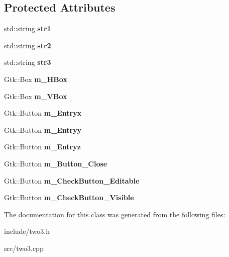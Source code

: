 \subsection*{Protected Attributes}
\begin{DoxyCompactItemize}
\item 
\mbox{\label{class_two3_a0ef9a390bf346f57853f823da22a2842}} 
std\+::string {\bfseries str1}
\item 
\mbox{\label{class_two3_af52736463c044343dfdde4d4ef3b5eb4}} 
std\+::string {\bfseries str2}
\item 
\mbox{\label{class_two3_a8c9c9bc6b481aaa5c80293a23464d367}} 
std\+::string {\bfseries str3}
\item 
\mbox{\label{class_two3_a6f8a95873dfb98bfe64b800dd4d35363}} 
Gtk\+::\+Box {\bfseries m\+\_\+\+H\+Box}
\item 
\mbox{\label{class_two3_a9b97da6413d7ef432bb8563a294fb035}} 
Gtk\+::\+Box {\bfseries m\+\_\+\+V\+Box}
\item 
\mbox{\label{class_two3_aa12311f7070757c39c099b4e4bb0c5cf}} 
Gtk\+::\+Button {\bfseries m\+\_\+\+Entryx}
\item 
\mbox{\label{class_two3_a4fbd233c33e30ec7c5872d9a7ab40210}} 
Gtk\+::\+Button {\bfseries m\+\_\+\+Entryy}
\item 
\mbox{\label{class_two3_ad153f4e4374740fccff887117a6f7bc2}} 
Gtk\+::\+Button {\bfseries m\+\_\+\+Entryz}
\item 
\mbox{\label{class_two3_a39c50e6cb6365ada9503a651e21a2fbd}} 
Gtk\+::\+Button {\bfseries m\+\_\+\+Button\+\_\+\+Close}
\item 
\mbox{\label{class_two3_a0b816fd2d1580adf113c750cb1953aef}} 
Gtk\+::\+Button {\bfseries m\+\_\+\+Check\+Button\+\_\+\+Editable}
\item 
\mbox{\label{class_two3_a727573e079e8214ee32836b4fb6b542f}} 
Gtk\+::\+Button {\bfseries m\+\_\+\+Check\+Button\+\_\+\+Visible}
\end{DoxyCompactItemize}


The documentation for this class was generated from the following files\+:\begin{DoxyCompactItemize}
\item 
include/two3.\+h\item 
src/two3.\+cpp\end{DoxyCompactItemize}
